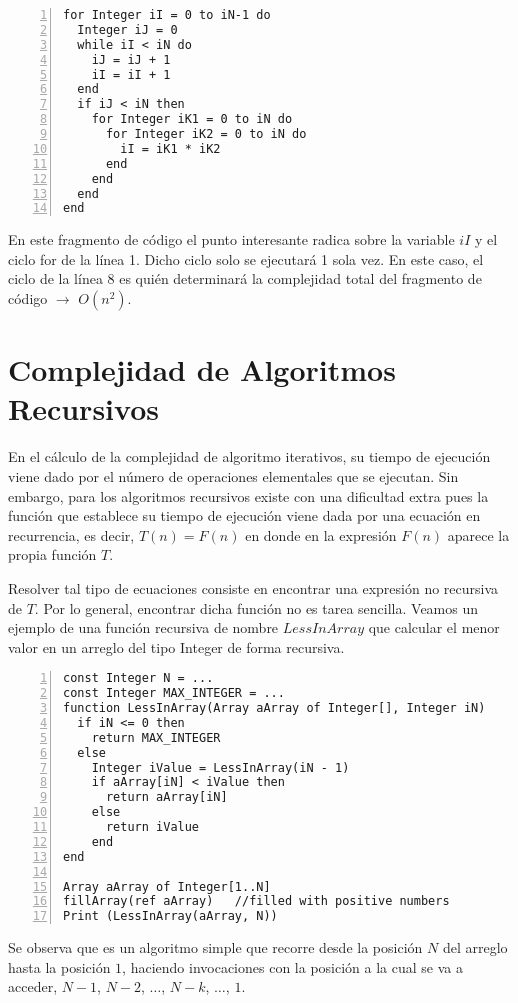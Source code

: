 \begin{lstlisting}[upquote=true, language=pseudo, numbers=left]
for Integer iI = 0 to iN-1 do
  Integer iJ = 0
  while iI < iN do
    iJ = iJ + 1
    iI = iI + 1
  end
  if iJ < iN then
    for Integer iK1 = 0 to iN do
      for Integer iK2 = 0 to iN do
        iI = iK1 * iK2
      end
    end
  end  
end
\end{lstlisting}

En este fragmento de código el punto interesante radica sobre la variable $iI$ y el ciclo for de la línea 1. Dicho ciclo solo se ejecutará 1 sola vez. En este caso, el ciclo de la línea 8 es quién determinará la complejidad total del fragmento de código $\rightarrow$ $O(n^{2})$.

\section{Complejidad de Algoritmos Recursivos}

En el cálculo de la complejidad de algoritmo iterativos, su tiempo de ejecución viene dado por el número de operaciones elementales que se ejecutan. Sin embargo, para los algoritmos recursivos existe con una dificultad extra pues la función que establece su tiempo de ejecución viene dada por una ecuación en recurrencia, es decir, $T(n) = F(n)$ en donde en la expresión $F(n)$ aparece la propia función $T$.

Resolver tal tipo de ecuaciones consiste en encontrar una expresión no recursiva de $T$. Por lo general, encontrar dicha función no es tarea sencilla. Veamos un ejemplo de una función recursiva de nombre $LessInArray$ que calcular el menor valor en un arreglo del tipo Integer de forma recursiva.

\begin{lstlisting}[upquote=true, language=pseudo, numbers=left]
const Integer N = ...
const Integer MAX_INTEGER = ...
function LessInArray(Array aArray of Integer[], Integer iN)
  if iN <= 0 then
    return MAX_INTEGER
  else
    Integer iValue = LessInArray(iN - 1)
    if aArray[iN] < iValue then
      return aArray[iN]
    else
      return iValue
    end
end

Array aArray of Integer[1..N]
fillArray(ref aArray)	//filled with positive numbers
Print (LessInArray(aArray, N))
\end{lstlisting}

Se observa que es un algoritmo simple que recorre desde la posición $N$ del arreglo hasta la posición $1$, haciendo invocaciones con la posición a la cual se va a acceder, $N-1$, $N-2$, $\dots$, $N-k$, $\dots$, $1$.

